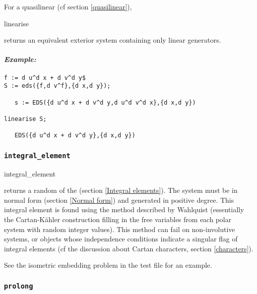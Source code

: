 For a quasilinear  (cf section \ref{quasilinear}),
\begin{edssyntax}
	linearise 
\end{edssyntax}
returns an equivalent exterior system containing only linear generators.

\paragraph{\it Example:}
\begin{verbatim}
f := d u^d x + d v^d y$
S := eds({f,d v^f},{d x,d y});

   s := EDS({d u^d x + d v^d y,d u^d v^d x},{d x,d y}) 

linearise S;

   EDS({d u^d x + d v^d y},{d x,d y}) 
\end{verbatim}

\subsubsection{\tt integral\_element}
\label{integral_element}

\begin{edssyntax}
	integral\_element 
\end{edssyntax}
returns a random  of the  (section
\ref{Integral elements}). The system must be in normal form (section
\ref{Normal form}) and generated in positive degree. This integral element
is found using the method described by Wahlquist \cite{Wahlquist:1993}
(essentially the Cartan-K{\"a}hler construction filling in the free variables
from each polar system with random integer values). This method can fail on
non-involutive systems, or  objects whose independence conditions
indicate a singular flag of integral elements (cf the discussion about
Cartan characters, section \ref{characters}).

See the isometric embedding problem in the test file for an example.

\subsubsection{\tt prolong}
\label{prolong}


